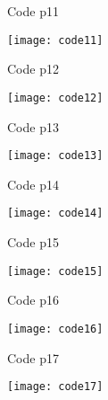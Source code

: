 \documentclass{beamer}
\begin{document}
\begin{frame}{Code p11}
    \begin{minipage}{0.95\textwidth}
        \centering
        \texttt{[image: code11]}
    \end{minipage} 
    
\end{frame}

\begin{frame}{Code p12}
    \begin{minipage}{0.95\textwidth}
        \centering
        \texttt{[image: code12]}
    \end{minipage} 
    
\end{frame}


\begin{frame}{Code p13}
    \begin{minipage}{0.95\textwidth}
        \centering
        \texttt{[image: code13]}
    \end{minipage} 
    
\end{frame}

\begin{frame}{Code p14}
    \begin{minipage}{0.95\textwidth}
        \centering
        \texttt{[image: code14]}
    \end{minipage} 
    
\end{frame}

\begin{frame}{Code p15}
    \begin{minipage}{0.95\textwidth}
        \centering
        \texttt{[image: code15]}
    \end{minipage} 
    
\end{frame}

\begin{frame}{Code p16}
    \begin{minipage}{0.95\textwidth}
        \centering
        \texttt{[image: code16]}
    \end{minipage} 
    
\end{frame}


\begin{frame}{Code p17}
    \begin{minipage}{0.95\textwidth}
        \centering
        \texttt{[image: code17]}
    \end{minipage} 
    
\end{frame}
\end{document}
